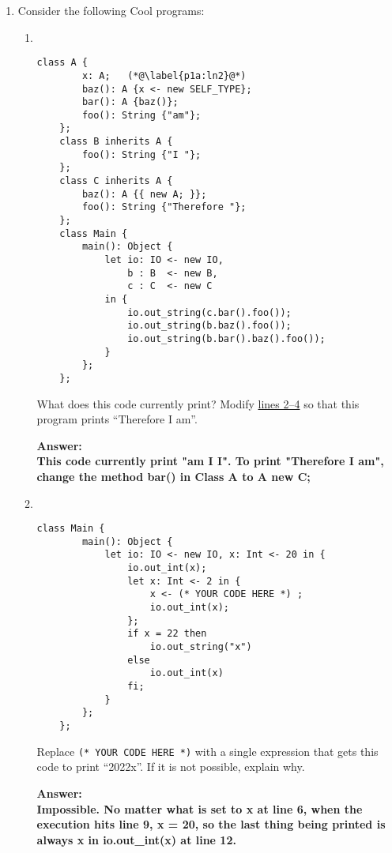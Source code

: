 \documentclass[11pt]{article}
\begin{document}
\begin{enumerate}
\item Consider the following Cool programs:
\begin{enumerate}
    \item ~
    \begin{lstlisting}[gobble=4, emph={x,io,a,b,c}, basicstyle=\small]
    class A {
        x: A;   (*@\label{p1a:ln2}@*)
        baz(): A {x <- new SELF_TYPE};
        bar(): A {baz()};
        foo(): String {"am"};
    };
    class B inherits A {
        foo(): String {"I "};
    };
    class C inherits A {
        baz(): A {{ new A; }};
        foo(): String {"Therefore "};
    };
    class Main {
        main(): Object {
            let io: IO <- new IO,
                b : B  <- new B,
                c : C  <- new C
            in {
                io.out_string(c.bar().foo());
                io.out_string(b.baz().foo());
                io.out_string(b.bar().baz().foo());
            }
        };
    };
    \end{lstlisting}
    What does this code currently print? Modify \hyperref[p1a:ln2]{lines 2--4} so that this program prints ``Therefore I am''.
    \bigskip

    \textbf{Answer:\\ 
    This code currently print "am I I". To print "Therefore I am", change the method bar() in Class A to A {new C};}

    \newpage

    \item ~
    \begin{lstlisting}[gobble=4, emph={io,x}, basicstyle=\small]
    class Main {
        main(): Object {
            let io: IO <- new IO, x: Int <- 20 in {
                io.out_int(x);
                let x: Int <- 2 in {
                    x <- (* YOUR CODE HERE *) ;
                    io.out_int(x);
                };
                if x = 22 then
                    io.out_string("x")
                else
                    io.out_int(x)
                fi;
            }
        };
    };
    \end{lstlisting}
    Replace \lstinline!(* YOUR CODE HERE *)! with a single expression that gets this code to print ``2022x''. If it is not possible, explain why.
    \bigskip

    \textbf{Answer:\\ 
    Impossible. No matter what is set to x at line 6, when the execution hits line 9, x = 20, so the last thing being printed is always x in io.out\_int(x) at line 12.}


\end{enumerate}
\end{enumerate}
\end{document}
